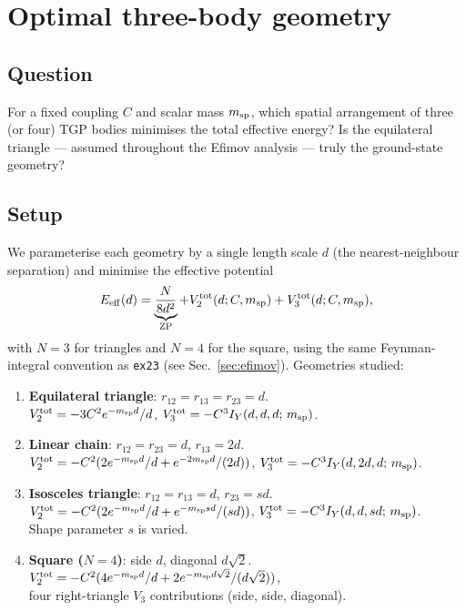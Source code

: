 \section{Optimal three-body geometry}
\label{sec:optimal_geometry}

\subsection{Question}

For a fixed coupling $C$ and scalar mass $m_{\rm sp}$, which spatial
arrangement of three (or four) TGP bodies minimises the total effective
energy?  Is the equilateral triangle — assumed throughout the Efimov
analysis — truly the ground-state geometry?

\subsection{Setup}

We parameterise each geometry by a single length scale $d$ (the
nearest-neighbour separation) and minimise the effective potential
\begin{equation}
  E_{\rm eff}(d) = \underbrace{\frac{N}{8d^2}}_{\rm ZP}
    + V_2^{\rm tot}(d;C,m_{\rm sp})
    + V_3^{\rm tot}(d;C,m_{\rm sp}),
\end{equation}
with $N=3$ for triangles and $N=4$ for the square, using the same
Feynman-integral convention as \texttt{ex23} (see
Sec.~\ref{sec:efimov}).  Geometries studied:

\begin{enumerate}
\item \textbf{Equilateral triangle}: $r_{12}=r_{13}=r_{23}=d$.\\
  $V_2^{\rm tot}=-3C^2 e^{-m_{\rm sp}d}/d$,\quad
  $V_3^{\rm tot}=-C^3 I_Y(d,d,d;\,m_{\rm sp})$.
\item \textbf{Linear chain}: $r_{12}=r_{23}=d$, $r_{13}=2d$.\\
  $V_2^{\rm tot}=-C^2(2e^{-m_{\rm sp}d}/d+e^{-2m_{\rm sp}d}/(2d))$,\quad
  $V_3^{\rm tot}=-C^3 I_Y(d,2d,d;\,m_{\rm sp})$.
\item \textbf{Isosceles triangle}: $r_{12}=r_{13}=d$, $r_{23}=sd$.\\
  $V_2^{\rm tot}=-C^2(2e^{-m_{\rm sp}d}/d+e^{-m_{\rm sp}sd}/(sd))$,\quad
  $V_3^{\rm tot}=-C^3 I_Y(d,d,sd;\,m_{\rm sp})$.\\
  Shape parameter $s$ is varied.
\item \textbf{Square ($N=4$)}: side $d$, diagonal $d\sqrt{2}$.\\
  $V_2^{\rm tot}=-C^2(4e^{-m_{\rm sp}d}/d+2e^{-m_{\rm sp}d\sqrt{2}}/(d\sqrt{2}))$,\\
  four right-triangle $V_3$ contributions (side, side, diagonal).
\end{enumerate}

